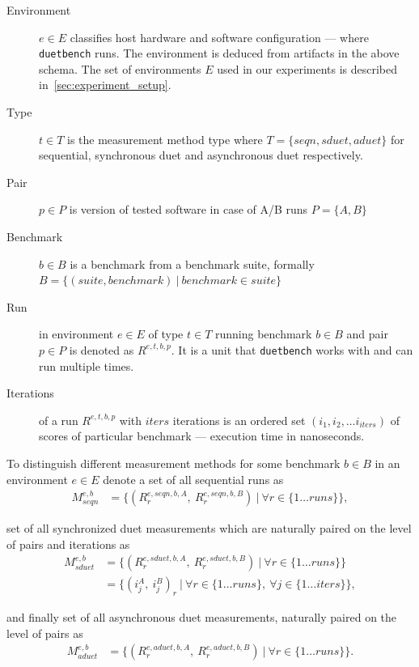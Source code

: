 \begin{description}
    \item[Environment] $e \in E$ classifies host hardware and software configuration --- where \lstinline{duetbench} runs.
        The environment is deduced from artifacts in the above schema.
        The set of environments $E$ used in our experiments is described in~\cref{sec:experiment_setup}.
    \item[Type] $t \in T$ is the measurement method type where $T = \{seqn, sduet, aduet\}$ for sequential, synchronous duet and asynchronous duet respectively.
    \item[Pair] $p \in P$ is version of tested software in case of A/B runs $P = \{A, B\}$
    \item[Benchmark] $b \in B$ is a benchmark from a benchmark suite, formally $B = \{(suite, benchmark)~|~benchmark \in suite \}$
    \item[Run] in environment $e \in E$ of type $t \in T$ running benchmark $b \in B$ and pair $p \in P$ is denoted as $R^{e, t, b, p}$.
        It is a unit that \lstinline{duetbench} works with and can run multiple times.
    \item[Iterations] of a run $R^{e, t, b, p}$ with $iters$ iterations is an ordered set $(i_1, i_2, \dots i_{iters})$ of scores of particular benchmark --- execution time in nanoseconds.
\end{description}

To distinguish different measurement methods for some benchmark $b \in B$ in an environment $e \in E$ denote a set of all sequential runs as
\begin{align*}
M^{e, b}_{seqn} &= \{(R^{e, seqn, b, A}_r,~R^{e, seqn, b, B}_r)~|~\forall r \in \{1 \dots runs\}\},
\end{align*}

set of all synchronized duet measurements which are naturally paired on the level of pairs and iterations as
\begin{align*}
M^{e, b}_{sduet} &= \{(R^{e, sduet, b, A}_r,~R^{e, sduet, b, B}_r)~|~\forall r \in \{1 \dots runs\}\}\\
                 &= \{(i^A_j,~i^B_j)_r~|~\forall r \in \{1 \dots runs\},~\forall j \in \{1 \dots iters\}\},
\end{align*}

and finally set of all asynchronous duet measurements, naturally paired on the level of pairs as
\begin{align*}
M^{e, b}_{aduet} &= \{(R^{e, aduet, b, A}_r,~R^{e, aduet, b, B}_r)~|~\forall r \in \{1 \dots runs\}\}.
\end{align*}

